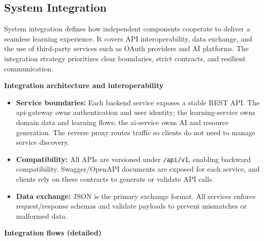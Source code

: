 \subsection{System Integration}

System integration defines how independent components cooperate to deliver a seamless learning experience. It covers API interoperability, data exchange, and the use of third-party services such as OAuth providers and AI platforms. The integration strategy prioritizes clear boundaries, strict contracts, and resilient communication.

\textbf{Integration architecture and interoperability}

\begin{itemize}
    \item \textbf{Service boundaries:} Each backend service exposes a stable REST API. The api-gateway owns authentication and user identity; the learning-service owns domain data and learning flows; the ai-service owns AI and resource generation. The reverse proxy routes traffic so clients do not need to manage service discovery.
    \item \textbf{Compatibility:} All APIs are versioned under \texttt{/api/v1}, enabling backward compatibility. Swagger/OpenAPI documents are exposed for each service, and clients rely on these contracts to generate or validate API calls.
    \item \textbf{Data exchange:} JSON is the primary exchange format. All services enforce request/response schemas and validate payloads to prevent mismatches or malformed data.
\end{itemize}

\textbf{Integration flows (detailed)}

